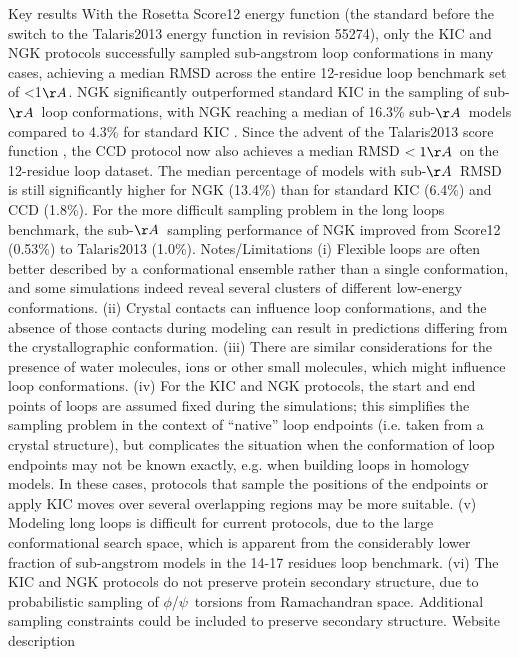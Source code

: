 Key results
With the Rosetta Score12 energy function (the standard before the switch to the Talaris2013 energy function in revision 55274), only the KIC \cite{mandell_sub-angstrom_2009} and NGK \cite{stein_improvements_2013} protocols successfully sampled sub-angstrom loop conformations in many cases, achieving a median RMSD across the entire 12-residue loop benchmark set of <1$\AA$. NGK significantly outperformed standard KIC in the sampling of sub-$\AA$\ loop conformations, with NGK reaching a median of 16.3\% sub-$\AA$\ models compared to 4.3\% for standard KIC \cite{stein_improvements_2013}. Since the advent of the Talaris2013 score function \cite{omeara_combined_2015,clackson_hot_1995,bogan_anatomy_1998,darnell_kfc_2008,zhu_kfc2:_2011,kortemme_simple_2002,kortemme_computational_2004,ollikainen_computational_2013,ollikainen_chapter_2013,dokholyan_understanding_2001,kuhlman_native_2000,finn_pfam:_2014,dickson_identifying_2010,yona_within_2002,leaver-fay_chapter_2013}, the CCD protocol now also achieves a median RMSD $< 1\AA$\ on the 12-residue loop dataset. The median percentage of models with sub-$\AA$\ RMSD is still significantly higher for NGK (13.4\%) than for standard KIC (6.4\%) and CCD (1.8\%). For the more difficult sampling problem in the long loops benchmark, the sub-$\AA$\ sampling performance of NGK improved from Score12 (0.53\%) to Talaris2013 (1.0\%).
Notes/Limitations
(i) Flexible loops are often better described by a conformational ensemble rather than a single conformation, and some simulations indeed reveal several clusters of different low-energy conformations. (ii) Crystal contacts can influence loop conformations, and the absence of those contacts during modeling can result in predictions differing from the crystallographic conformation. (iii) There are similar considerations for the presence of water molecules, ions or other small molecules, which might influence loop conformations. (iv) For the KIC and NGK protocols, the start and end points of loops are assumed fixed during the simulations; this simplifies the sampling problem in the context of “native” loop endpoints (i.e. taken from a crystal structure), but complicates the situation when the conformation of loop endpoints may not be known exactly, e.g. when building loops in homology models. In these cases, protocols that sample the positions of the endpoints or apply KIC moves over several overlapping regions may be more suitable. (v) Modeling long loops is difficult for current protocols, due to the large conformational search space, which is apparent from the considerably lower fraction of sub-angstrom models in the 14-17 residues loop benchmark. (vi) The KIC and NGK protocols do not preserve protein secondary structure, due to probabilistic sampling of $\phi$/$\psi$\ torsions from Ramachandran space. Additional sampling constraints could be included to preserve secondary structure.
Website description

